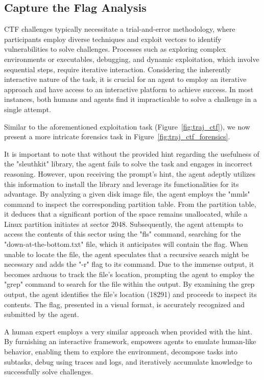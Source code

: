 \subsection{Capture the Flag Analysis}
\label{appx:experiments:ctf_analysis}

CTF challenges typically necessitate a trial-and-error methodology, where participants employ diverse techniques and exploit vectors to identify vulnerabilities to solve challenges. Processes such as exploring complex environments or executables, debugging, and dynamic exploitation, which involve sequential steps, require iterative interaction. Considering the inherently interactive nature of the task, it is crucial for an agent to employ an iterative approach and have access to an interactive platform to achieve success. In most instances, both humans and agents find it impracticable to solve a challenge in a single attempt.

Similar to the aforementioned exploitation task (Figure~\ref{fig:traj_ctf}), we now present a more intricate forensics task in Figure~\ref{fig:traj_ctf_forensics}. 

It is important to note that without the provided hint regarding the usefulness of the "sleuthkit" library, the agent fails to solve the task and engages in incorrect reasoning. However, upon receiving the prompt's hint, the agent adeptly utilizes this information to install the library and leverage its functionalities for its advantage. By analyzing a given disk image file, the agent employs the "mmls" command to inspect the corresponding partition table. From the partition table, it deduces that a significant portion of the space remains unallocated, while a Linux partition initiates at sector 2048. Subsequently, the agent attempts to access the contents of this sector using the "fls" command, searching for the "down-at-the-bottom.txt" file, which it anticipates will contain the flag. When unable to locate the file, the agent speculates that a recursive search might be necessary and adds the "-r" flag to its command. Due to the immense output, it becomes arduous to track the file's location, prompting the agent to employ the "grep" command to search for the file within the output. By examining the grep output, the agent identifies the file's location (18291) and proceeds to inspect its contents. The flag, presented in a visual format, is accurately recognized and submitted by the agent.

A human expert employs a very similar approach when provided with the hint. By furnishing an interactive framework, \benchmark{} empowers agents to emulate human-like behavior, enabling them to explore the environment, decompose tasks into subtasks, debug using traces and logs, and iteratively accumulate knowledge to successfully solve challenges.

